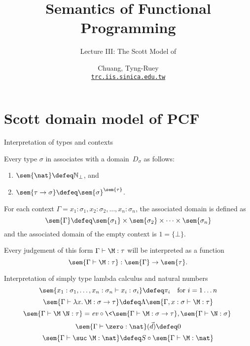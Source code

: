 \title{Semantics of Functional Programming}
\subtitle{Lecture III: The Scott Model of \PCF}
\author[T.-R. Chuang]{Chuang, Tyng-Ruey \\
  \href{mailto@trc.iis.sinica.edu.tw}{\texttt{trc.iis.sinica.edu.tw}}}

\frame{\maketitle}
\section{Scott domain model of PCF}  
\begin{frame}{Interpretation of types and contexts}
  \begin{definition}
  Every type $\sigma$ in \PCF{} associates with a domain~$D_\sigma$ as
  follows:

    \begin{enumerate}
      \item $\sem{\nat} \defeq \mathbb{N}_\bot$, and
      \item $\sem{\tau \to \sigma} \defeq \sem{\sigma}^{\sem{\tau}}$.
    \end{enumerate}
  \end{definition}
  \begin{definition}
    For each context $\Gamma = x_1 : \sigma_1, x_2 : \sigma_2,
    \dots, x_n : \sigma_n$, the associated domain is defined as
    \[
      \sem{\Gamma} \defeq \sem{\sigma_1} \times \sem{\sigma_2}
      \times \dots \times \sem{\sigma_n}
    \]
    and the associated domain of the empty context is $1 = \{\bot\}$. 
  \end{definition}
  Every judgement of this form $\Gamma \vdash \M : \tau$ will be interpreted as
  a function
  \[
    \sem{\Gamma \vdash \M : \tau} : \sem{\Gamma} \to \sem{\tau}.
  \]
\end{frame}

\begin{frame}{Interpretation of simply type lambda calculus
  and natural numbers}
  \[
    \sem{ x_1 : \sigma_1, \dots, x_n : \sigma_n \vdash
      x_i : \sigma_i } \defeq \pi_i
    \quad\text{for $i = 1 \dots n$}
  \]
  \[ 
    \sem{\Gamma \vdash \lambda x.\, \M : \sigma \to \tau} \defeq
    \Lambda\sem{\Gamma, x : \sigma \vdash \M : \tau}
  \]
  \[
    \sem{\Gamma \vdash \M\;\N : \tau} = \mathit{ev}
    \circ \<\sem{\Gamma \vdash
      \M : \sigma \to \tau}, \sem{\Gamma \vdash \N : \sigma}\>
  \]
  \[
    \sem{\Gamma \vdash \zero : \nat}(\vec{d}) \defeq 0
  \]
  \[
    \sem{\Gamma \vdash \suc\;\M : \nat} \defeq S \circ \sem{\Gamma
      \vdash \M : \nat}
  \]
\end{frame}


